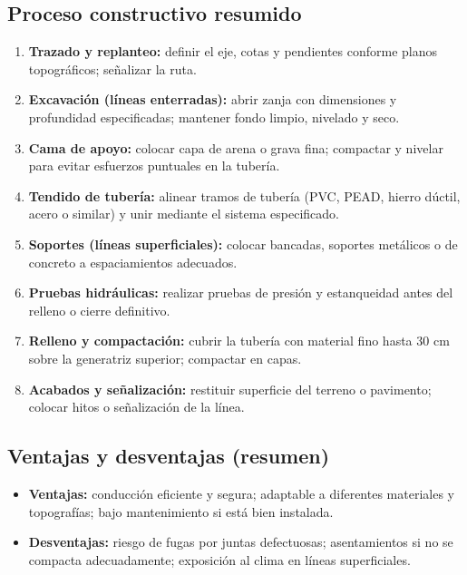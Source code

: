 \documentclass[12pt]{article}
\begin{document}
	\subsection*{Proceso constructivo resumido}
	\begin{enumerate}[leftmargin=*, itemsep=2pt]
		\item \textbf{Trazado y replanteo:} definir el eje, cotas y pendientes conforme planos topográficos; señalizar la ruta.
		\item \textbf{Excavación (líneas enterradas):} abrir zanja con dimensiones y profundidad especificadas; mantener fondo limpio, nivelado y seco.
		\item \textbf{Cama de apoyo:} colocar capa de arena o grava fina; compactar y nivelar para evitar esfuerzos puntuales en la tubería.
		\item \textbf{Tendido de tubería:} alinear tramos de tubería (PVC, PEAD, hierro dúctil, acero o similar) y unir mediante el sistema especificado.
		\item \textbf{Soportes (líneas superficiales):} colocar bancadas, soportes metálicos o de concreto a espaciamientos adecuados.
		\item \textbf{Pruebas hidráulicas:} realizar pruebas de presión y estanqueidad antes del relleno o cierre definitivo.
		\item \textbf{Relleno y compactación:} cubrir la tubería con material fino hasta 30 cm sobre la generatriz superior; compactar en capas.
		\item \textbf{Acabados y señalización:} restituir superficie del terreno o pavimento; colocar hitos o señalización de la línea.
	\end{enumerate}
	
	\subsection*{Ventajas y desventajas (resumen)}
	\begin{itemize}[leftmargin=*, itemsep=2pt]
		\item \textbf{Ventajas:} conducción eficiente y segura; adaptable a diferentes materiales y topografías; bajo mantenimiento si está bien instalada.
		\item \textbf{Desventajas:} riesgo de fugas por juntas defectuosas; asentamientos si no se compacta adecuadamente; exposición al clima en líneas superficiales.
	\end{itemize}
	
\end{document}
